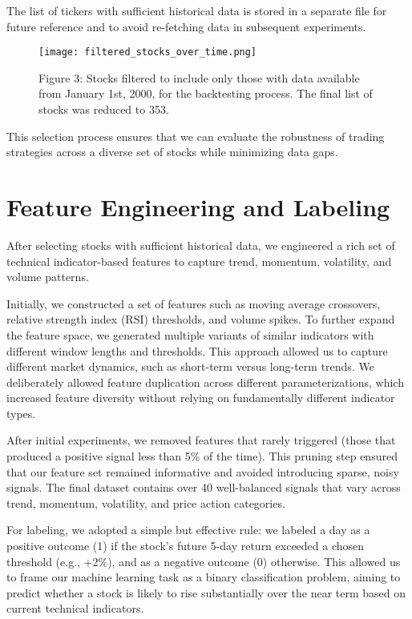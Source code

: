 \documentclass{article}
\begin{document}
The list of tickers with sufficient historical data is stored in a separate file for future reference and to avoid re-fetching data in subsequent experiments.

\begin{figure}[h]
    \centering
    \texttt{[image: filtered\_stocks\_over\_time.png]}
    \caption{Figure 3: Stocks filtered to include only those with data available from January 1st, 2000, for the backtesting process. The final list of stocks was reduced to 353.}
    \label{fig:filtered_stocks}
\end{figure}

This selection process ensures that we can evaluate the robustness of trading strategies across a diverse set of stocks while minimizing data gaps.

\section{Feature Engineering and Labeling}

After selecting stocks with sufficient historical data, we engineered a rich set of technical indicator-based features to capture trend, momentum, volatility, and volume patterns.

Initially, we constructed a set of features such as moving average crossovers, relative strength index (RSI) thresholds, and volume spikes. To further expand the feature space, we generated multiple variants of similar indicators with different window lengths and thresholds. This approach allowed us to capture different market dynamics, such as short-term versus long-term trends. We deliberately allowed feature duplication across different parameterizations, which increased feature diversity without relying on fundamentally different indicator types.

After initial experiments, we removed features that rarely triggered (those that produced a positive signal less than 5\% of the time). This pruning step ensured that our feature set remained informative and avoided introducing sparse, noisy signals. The final dataset contains over 40 well-balanced signals that vary across trend, momentum, volatility, and price action categories.

For labeling, we adopted a simple but effective rule: we labeled a day as a positive outcome (1) if the stock’s future 5-day return exceeded a chosen threshold (e.g., +2\%), and as a negative outcome (0) otherwise. This allowed us to frame our machine learning task as a binary classification problem, aiming to predict whether a stock is likely to rise substantially over the near term based on current technical indicators.
\end{document}
